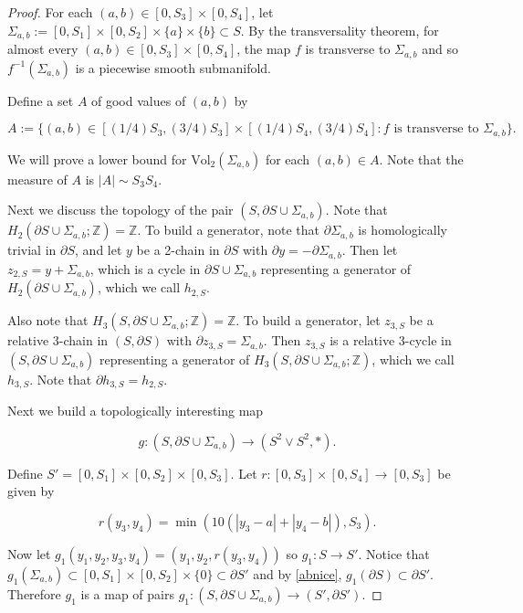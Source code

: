\documentclass{amsart}
\newtheorem*{theorem 1}{Theorem 1}
\newtheorem*{theorem 2}{Theorem 2}
\newtheorem*{theorem 3}{Theorem 3}
\numberwithin{equation}{section}
\newcommand{\Vol}{\textrm{Vol}}
\newcommand{\ZZ}{\mathbb{Z}}
\begin{document}
\begin{proof}

For each $(a,b) \in [0, S_3] \times [0, S_4]$,  let $\Sigma_{a, b} := [0, S_1] \times [0, S_2] \times \{a \} \times \{ b \} \subset S$.   By the transversality theorem,  for almost every $(a,b) \in  [0, S_3] \times [0, S_4]$,  the map $f$ is transverse to $\Sigma_{a,b}$ and so $f^{-1}(\Sigma_{a,b})$ is a piecewise smooth submanifold.   

Define a set $A$ of good values of $(a,b)$ by

\begin{equation} \label{abnice}  A := \{ (a,b) \in [(1/4) S_3, (3/4) S_3] \times [(1/4) S_4, (3/4) S_4]: f \textrm{ is transverse to } \Sigma_{a,b} \} . \end{equation}  

We will prove a lower bound for $\Vol_2(\Sigma_{a,b})$ for each $(a,b) \in A$.  Note that the measure of $A$ is $|A| \sim S_3 S_4$.  

Next we discuss the topology of the pair $(S,  \partial S \cup \Sigma_{a,b})$.   Note that $H_2(\partial S \cup \Sigma_{a,b}; \ZZ) = \ZZ$.   To build a generator,  note that $\partial \Sigma_{a,b}$ is homologically trivial in $\partial S$,  and let $y$ be a 2-chain in $\partial S$ with $\partial y = - \partial \Sigma_{a,b}$.   Then let $z_{2,  S} = y + \Sigma_{a,b}$,  which is a cycle in $\partial S \cup \Sigma_{a,b}$ representing a generator of $H_2(\partial S \cup \Sigma_{a,b})$,  which we call $h_{2,S}$.   

Also note that $H_3(S,  \partial S \cup \Sigma_{a,b}; \ZZ) = \ZZ$.   To build a generator,  let $z_{3,  S}$ be a relative 3-chain in $(S, \partial S)$ with $\partial z_{3,  S} = \Sigma_{a,b}$.    Then $z_{3,  S}$ is a relative 3-cycle in $(S,  \partial S \cup \Sigma_{a,b})$ representing a generator of $H_3(S,  \partial S \cup \Sigma_{a,b}; \ZZ)$,  which we call $h_{3, S}$.   Note that $\partial h_{3,S} = h_{2,S}$.

Next we build a topologically interesting map

$$ g: (S,  \partial S \cup \Sigma_{a,b} ) \rightarrow (S^2 \vee S^2, *). $$

Define $S' = [0,S_1] \times [0,  S_2] \times [0, S_3]$.    Let $r: [0, S_3] \times [0, S_4] \rightarrow [0, S_3]$ be given by 

$$ r(y_3, y_4) = \min(  10 ( |y_3 - a| + |y_4 - b| ),  S_3 ).  $$

Now let $g_1 (y_1, y_2, y_3, y_4) = (y_1, y_2,  r(y_3, y_4))$ so $g_1: S \rightarrow S'$.    Notice that $g_1(\Sigma_{a,b}) \subset [0,S_1] \times [0, S_2] \times \{0 \} \subset \partial S'$ and by \eqref{abnice},  $g_1(\partial S) \subset \partial S'$.   Therefore $g_1$ is a map of pairs $g_1: (S,  \partial S \cup \Sigma_{a,b}) \rightarrow (S',  \partial S')$.


\end{proof}
\end{document}
